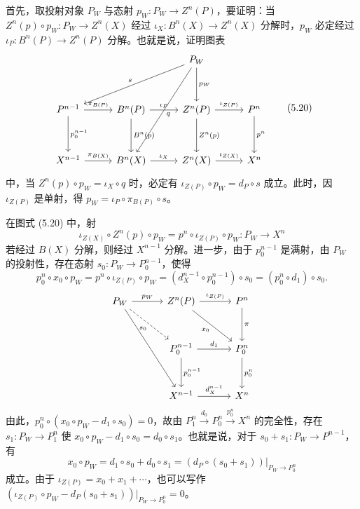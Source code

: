 首先，取投射对象 $P_W$ 与态射 $p_W\colon P_W\to Z^n(P)$，要证明：当 $Z^n(p)\circ p_W\colon P_W\to Z^n(X)$ 经过 $\iota_X\colon B^n(X)\to Z^n(X)$ 分解时，$p_W$ 必定经过 $\iota_P\colon B^n(P)\to Z^n(P)$ 分解。也就是说，证明图表
\begin{equation}
\begin{tikzcd}[row sep=3.4em, column sep=2.8em]
 & & P_W \arrow[d,"p_W"] \arrow[dll,"s"'] \arrow[ddl,"q"] & \\
P^{n-1} \arrow[r,"\pi_{B(P)}"] \arrow[d,"p_0^{n-1}"] & B^n(P) \arrow[r,"\iota_P"] \arrow[d,"B^n(p)"] & Z^n(P) \arrow[r,"\iota_{Z(P)}"] \arrow[d,"Z^n(p)"] & P^n \arrow[d,"p^n"]\\
X^{n-1} \arrow[r,"\pi_{B(X)}"] & B^n(X) \arrow[r,"\iota_X"] & Z^n(X) \arrow[r,"\iota_{Z(X)}"] & X^n
\end{tikzcd} \tag{5.20}
\end{equation}
中，当 $Z^n(p)\circ p_W=\iota_X\circ q$ 时，必定有 $\iota_{Z(P)}\circ p_W=d_P\circ s$ 成立。此时，因 $\iota_{Z(P)}$ 是单射，得 $p_W=\iota_P\circ\pi_{B(P)}\circ s$。


在图式 (5.20) 中，射
\[
  \iota_{Z(X)}\circ Z^n(p)\circ p_W=p^n\circ\iota_{Z(P)}\circ p_W\colon P_W\to X^n
\]
若经过 $B(X)$ 分解，则经过 $X^{n-1}$ 分解。进一步，由于 $p_0^{n-1}$ 是满射，由 $P_W$ 的投射性，存在态射 $s_0\colon P_W\to P_0^{n-1}$，使得
\[
  p_0^n\circ x_0\circ p_W=p^n\circ\iota_{Z(P)}\circ p_W=(d_X^{n-1}\circ p_0^{n-1})\circ s_0=(p_0^n\circ d_1)\circ s_0.
\]
\[\begin{tikzcd}[row sep=3.0em, column sep=3.2em]
P_W \arrow[r,"p_W"] \arrow[dr,dashed,"s_0"'] \arrow[ddr] & Z^n(P) \arrow[r,"\iota_{Z(P)}"] \arrow[dr,"x_0"'] & P^n \arrow[d,"\pi"]\\
 & P_0^{n-1} \arrow[r,"d_1"] \arrow[d,"p_0^{n-1}"] & P_0^n \arrow[d,"p_0^n"]\\
 & X^{n-1} \arrow[r,"d_X^{n-1}"] & X^n
\end{tikzcd}\]
由此，$p_0^n\circ(x_0\circ p_W-d_1\circ s_0)=0$，故由 $P_1^n\xrightarrow{d_0}P_0^n\xrightarrow{p_0^n}X^n$ 的完全性，存在 $s_1\colon P_W\to P_1^n$ 使 $x_0\circ p_W-d_1\circ s_0=d_0\circ s_1$。也就是说，对于 $s_0+s_1\colon P_W\to P^{n-1}$，有
\[
  x_0\circ p_W=d_1\circ s_0+d_0\circ s_1=(d_P\circ(s_0+s_1))|_{P_W\to P_0^n}
\]
成立。由于 $\iota_{Z(P)}=x_0+x_1+\cdots$，也可以写作 $(\iota_{Z(P)}\circ p_W-d_P(s_0+s_1))|_{P_W\to P_0^n}=0$。


